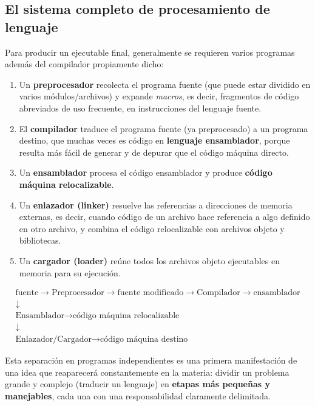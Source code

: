 \documentclass[11pt,a4paper]{article}
\begin{document}
\subsection{El sistema completo de procesamiento de lenguaje}

Para producir un ejecutable final, generalmente se requieren varios programas además del
compilador propiamente dicho:

\begin{enumerate}
    \item Un \textbf{preprocesador} recolecta el programa fuente (que puede estar dividido en
    varios módulos/archivos) y expande \textit{macros}, es decir, fragmentos de código
    abreviados de uso frecuente, en instrucciones del lenguaje fuente.
    \item El \textbf{compilador} traduce el programa fuente (ya preprocesado) a un programa
    destino, que muchas veces es código en \textbf{lenguaje ensamblador}, porque resulta más
    fácil de generar y de depurar que el código máquina directo.
    \item Un \textbf{ensamblador} procesa el código ensamblador y produce \textbf{código máquina
    relocalizable}.
    \item Un \textbf{enlazador (linker)} resuelve las referencias a direcciones de memoria
    externas, es decir, cuando código de un archivo hace referencia a algo definido en otro
    archivo, y combina el código relocalizable con archivos objeto y bibliotecas.
    \item Un \textbf{cargador (loader)} reúne todos los archivos objeto ejecutables en memoria
    para su ejecución.
\end{enumerate}

\[
\begin{array}{c}
\text{fuente} \to \boxed{\text{Preprocesador}} \to \text{fuente modificado} \to
\boxed{\text{Compilador}} \to \text{ensamblador} \\[6pt]
\downarrow \\[6pt]
\boxed{\text{Ensamblador}} \to \text{código máquina relocalizable} \\[6pt]
\downarrow \\[6pt]
\boxed{\text{Enlazador/Cargador}} \to \text{código máquina destino}
\end{array}
\]

Esta separación en programas independientes es una primera manifestación de una idea que
reaparecerá constantemente en la materia: dividir un problema grande y complejo (traducir un
lenguaje) en \textbf{etapas más pequeñas y manejables}, cada una con una responsabilidad
claramente delimitada.
\end{document}
